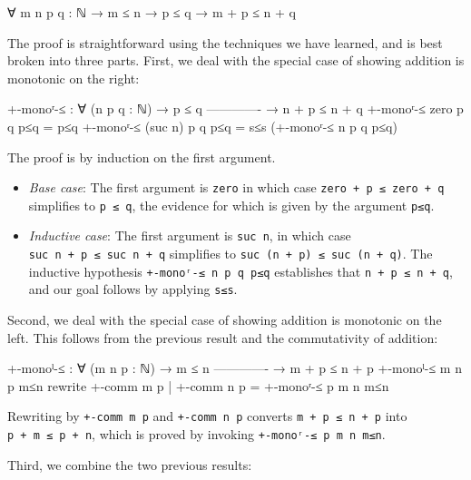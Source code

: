 \begin{myDisplay}
∀ {m n p q : ℕ} → m ≤ n → p ≤ q → m + p ≤ n + q
\end{myDisplay}

The proof is straightforward using the techniques we have learned, and
is best broken into three parts. First, we deal with the special case of
showing addition is monotonic on the right:

\begin{fence}
\begin{code}
+-monoʳ-≤ : ∀ (n p q : ℕ)
  → p ≤ q
    -------------
  → n + p ≤ n + q
+-monoʳ-≤ zero    p q p≤q  =  p≤q
+-monoʳ-≤ (suc n) p q p≤q  =  s≤s (+-monoʳ-≤ n p q p≤q)
\end{code}
\end{fence}

The proof is by induction on the first argument.

\begin{itemize}
\item
  \emph{Base case}: The first argument is \texttt{zero} in which case
  \texttt{zero\ +\ p\ ≤\ zero\ +\ q} simplifies to \texttt{p\ ≤\ q}, the
  evidence for which is given by the argument \texttt{p≤q}.
\item
  \emph{Inductive case}: The first argument is \texttt{suc\ n}, in which
  case \texttt{suc\ n\ +\ p\ ≤\ suc\ n\ +\ q} simplifies to
  \texttt{suc\ (n\ +\ p)\ ≤\ suc\ (n\ +\ q)}. The inductive hypothesis
  \texttt{+-monoʳ-≤\ n\ p\ q\ p≤q} establishes that
  \texttt{n\ +\ p\ ≤\ n\ +\ q}, and our goal follows by applying
  \texttt{s≤s}.
\end{itemize}

Second, we deal with the special case of showing addition is monotonic
on the left. This follows from the previous result and the commutativity
of addition:

\begin{fence}
\begin{code}
+-monoˡ-≤ : ∀ (m n p : ℕ)
  → m ≤ n
    -------------
  → m + p ≤ n + p
+-monoˡ-≤ m n p m≤n  rewrite +-comm m p | +-comm n p  = +-monoʳ-≤ p m n m≤n
\end{code}
\end{fence}

Rewriting by \texttt{+-comm\ m\ p} and \texttt{+-comm\ n\ p} converts
\texttt{m\ +\ p\ ≤\ n\ +\ p} into \texttt{p\ +\ m\ ≤\ p\ +\ n}, which is
proved by invoking \texttt{+-monoʳ-≤\ p\ m\ n\ m≤n}.

Third, we combine the two previous results:

